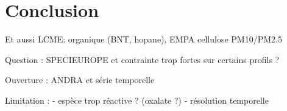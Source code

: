 % 

%
% 


\section{Conclusion}%
\label{sec:conclusion}

Et aussi LCME: organique (BNT, hopane), EMPA cellulose PM10/PM2.5

Question : SPECIEUROPE et contrainte trop fortes sur certains profils ?

Ouverture : ANDRA et série temporelle

Limitation : 
- espèce trop réactive ? (oxalate ?)
- résolution temporelle

